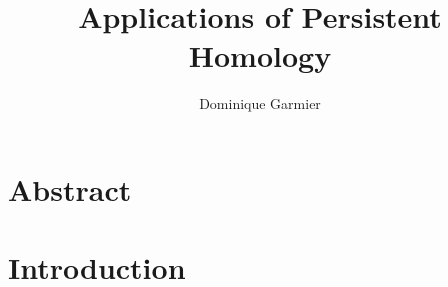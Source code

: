 \documentclass{article}
\title{Applications of Persistent Homology}
\author{Dominique Garmier }
\begin{document}
\maketitle

\section{Abstract}
\section{Introduction}
\end{document}
